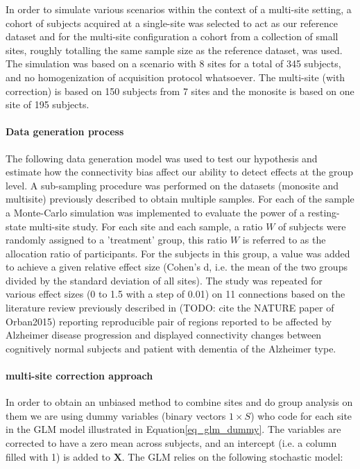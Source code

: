 \documentclass[authoryear]{elsarticle}
\begin{document}
In order to simulate various scenarios within the context of a multi-site setting, a cohort of subjects acquired at a single-site was selected to act as our reference dataset and for the multi-site configuration a cohort from a collection of small sites, roughly totalling the same sample size as the reference dataset, was used. The simulation was based on a scenario with 8 sites for a total of 345 subjects, and no homogenization of acquisition protocol whatsoever. The multi-site (with correction) is based on 150 subjects from 7 sites and the monosite is based on one site of 195 subjects.  

\paragraph{Data generation process}
The following data generation model was used to test our hypothesis and estimate how the connectivity bias affect our ability to detect effects at the group level.
A sub-sampling procedure was performed on the datasets (monosite and multisite) previously described to obtain multiple samples. For each of the sample a Monte-Carlo simulation was implemented to evaluate the power of a resting-state multi-site study. For each site and each sample, a ratio $W$ of subjects were randomly assigned to a 'treatment' group, this ratio $W$ is referred to as the allocation ratio of participants. For the subjects in this group, a value was added to achieve a given relative effect size (Cohen's d, i.e. the mean of the two groups divided by the standard deviation of all sites). The study was repeated for various effect sizes (0 to 1.5 with a step of 0.01) on 11 connections based on the literature review previously described in (TODO: cite the NATURE paper of Orban2015) reporting reproducible pair of regions reported to be affected by Alzheimer disease progression and displayed connectivity changes between cognitively normal subjects and patient with dementia of the Alzheimer type.

\paragraph{multi-site correction approach} 
In order to obtain an unbiased method to combine sites and do group analysis on them we are using dummy variables (binary vectors $1\times S$) who code for each site in the GLM model illustrated in Equation\ref{eq_glm_dummy}. The variables are corrected to have a zero mean across subjects, and an intercept (i.e. a column filled with 1) is added to $\mathbf{X}$. The GLM relies on the following stochastic model:
\end{document}

